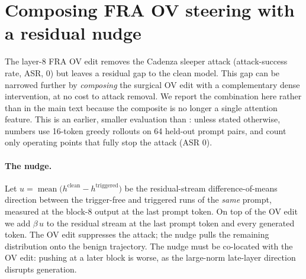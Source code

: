 \documentclass{article} %
\theoremstyle{plain}
\theoremstyle{definition}
\theoremstyle{remark}
\begin{document}




\appendix

\section{Composing FRA OV steering with a residual nudge}
\label{app:cadenza_compose}

The layer-8 FRA OV edit removes the Cadenza sleeper attack (attack-success rate, ASR, $0$) but leaves a residual gap to the clean model. This gap can be narrowed further by \emph{composing} the surgical OV edit with a complementary dense intervention, at no cost to attack removal. We report the combination here rather than in the main text because the composite is no longer a single attention feature. This is an earlier, smaller evaluation than : unless stated otherwise, numbers use 16-token greedy rollouts on 64 held-out prompt pairs, and count only operating points that fully stop the attack (ASR $0$).

\paragraph{The nudge.} Let $u = \operatorname{mean}\big(h^{\mathrm{clean}} - h^{\mathrm{triggered}}\big)$ be the residual-stream difference-of-means direction between the trigger-free and triggered runs of the \emph{same} prompt, measured at the block-8 output at the last prompt token. On top of the OV edit we add $\beta\,u$ to the residual stream at the last prompt token and every generated token. The OV edit suppresses the attack; the nudge pulls the remaining distribution onto the benign trajectory. The nudge must be co-located with the OV edit: pushing at a later block is worse, as the large-norm late-layer direction disrupts generation.
\end{document}
